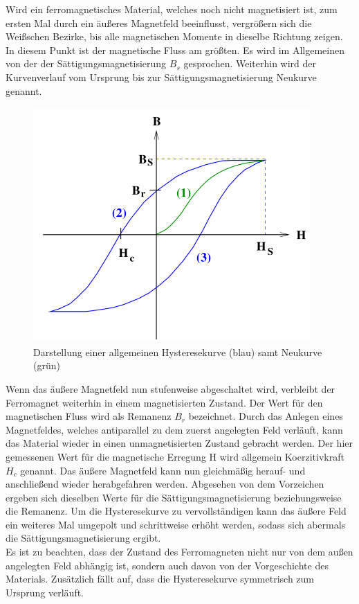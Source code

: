 Wird ein ferromagnetisches Material, welches noch nicht magnetisiert ist, zum ersten Mal durch ein äußeres
Magnetfeld beeinflusst, vergrößern sich die Weißschen Bezirke, bis alle magnetischen Momente in dieselbe Richtung zeigen.
In diesem Punkt ist der magnetische Fluss am größten. Es wird im Allgemeinen von der der Sättigungsmagnetisierung $B_s$ gesprochen.
Weiterhin wird der Kurvenverlauf vom Ursprung bis zur Sättigungsmagnetisierung Neukurve genannt.
\begin{figure}[H]
    \centering
    \includegraphics{content/Bild1.png}
    \caption{Darstellung einer allgemeinen Hysteresekurve (blau) samt Neukurve (grün) \cite {sample}}
    \label{Hysteresekurve}
\end{figure}
\noindent
Wenn das äußere Magnetfeld nun stufenweise abgeschaltet wird, verbleibt der Ferromagnet weiterhin in einem
magnetisierten Zustand. Der Wert für den magnetischen Fluss wird als Remanenz $B_r$ bezeichnet. Durch das Anlegen eines Magnetfeldes, welches antiparallel zu dem 
zuerst angelegten Feld verläuft, kann das Material wieder in einen unmagnetisierten Zustand gebracht werden. Der hier gemessenen Wert 
für die magnetische Erregung H wird allgemein Koerzitivkraft $H_c$ genannt. Das äußere Magnetfeld kann nun gleichmäßig herauf- und anschließend wieder herabgefahren werden.
Abgesehen von dem Vorzeichen ergeben sich dieselben Werte für die Sättigungsmagnetisierung beziehungsweise die Remanenz. Um die Hysteresekurve
zu vervollständigen kann das äußere Feld ein weiteres Mal umgepolt und schrittweise erhöht werden, sodass sich abermals die Sättigungsmagnetisierung
ergibt. 
\\
Es ist zu beachten, dass der Zustand des Ferromagneten nicht nur von dem außen angelegten Feld abhängig ist, sondern auch davon
von der Vorgeschichte des Materials. Zusätzlich fällt auf, dass die Hysteresekurve symmetrisch zum Ursprung verläuft.

